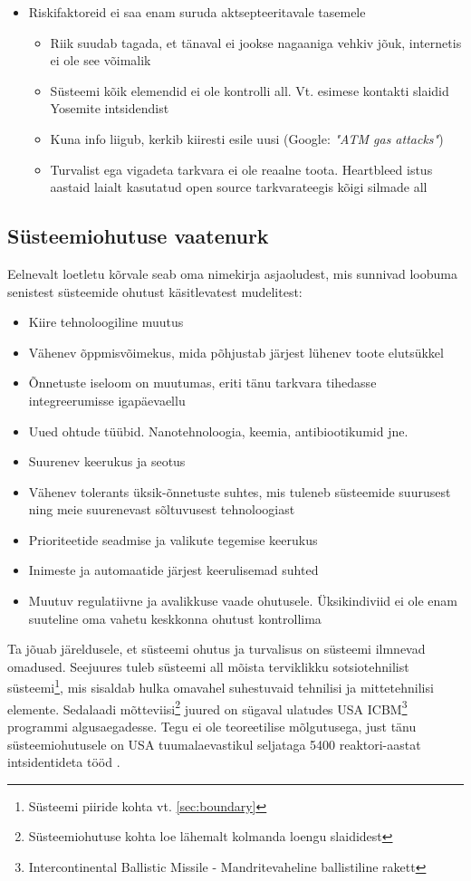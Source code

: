 \documentclass{article}
\begin{document}
\begin{itemize}
		\item Riskifaktoreid ei saa enam suruda aktsepteeritavale tasemele
			\begin{itemize}
		\item Riik suudab tagada, et tänaval ei jookse nagaaniga vehkiv jõuk, internetis ei ole see võimalik
		\item Süsteemi kõik elemendid ei ole kontrolli all. Vt. esimese kontakti slaidid Yosemite intsidendist
		\item Kuna info liigub, kerkib kiiresti esile uusi (Google: \emph{"ATM gas attacks"})
		\item Turvalist ega vigadeta tarkvara ei ole reaalne toota. Heartbleed istus aastaid laialt kasutatud open source tarkvarateegis kõigi silmade all
	\end{itemize}

\end{itemize}
\subsection{Süsteemiohutuse vaatenurk}
Eelnevalt loetletu kõrvale seab \cite{leveson2011engineering} oma nimekirja asjaoludest, mis sunnivad loobuma senistest süsteemide ohutust käsitlevatest mudelitest:
\begin{itemize}
	\item Kiire tehnoloogiline muutus
	\item Vähenev õppmisvõimekus, mida põhjustab järjest lühenev toote elutsükkel
	\item Õnnetuste iseloom on muutumas, eriti tänu tarkvara tihedasse integreerumisse igapäevaellu
	\item Uued ohtude tüübid. Nanotehnoloogia, keemia, antibiootikumid jne.
	\item Suurenev keerukus ja seotus
	\item Vähenev tolerants üksik-õnnetuste suhtes, mis tuleneb süsteemide suurusest ning meie suurenevast sõltuvusest tehnoloogiast
	\item Prioriteetide seadmise ja valikute tegemise keerukus
	\item Inimeste ja automaatide järjest keerulisemad suhted
	\item Muutuv regulatiivne ja avalikkuse vaade ohutusele. Üksikindiviid ei ole enam suuteline oma vahetu keskkonna ohutust kontrollima
\end{itemize}

Ta jõuab järeldusele, et süsteemi ohutus ja turvalisus on süsteemi ilmnevad omadused. Seejuures tuleb süsteemi all mõista terviklikku sotsiotehnilist süsteemi\footnote{Süsteemi piiride kohta vt. \ref{sec:boundary}}, mis sisaldab hulka omavahel suhestuvaid tehnilisi ja mittetehnilisi elemente. Sedalaadi mõtteviisi\footnote{Süsteemiohutuse kohta loe lähemalt kolmanda loengu slaididest} juured on sügaval ulatudes USA ICBM\footnote{Intercontinental Ballistic Missile - Mandritevaheline ballistiline rakett} programmi algusaegadesse. Tegu ei ole teoreetilise mõlgutusega, just tänu süsteemiohutusele on USA tuumalaevastikul seljataga 5400 reaktori-aastat intsidentideta tööd \citep{navy}. 
\end{document}
